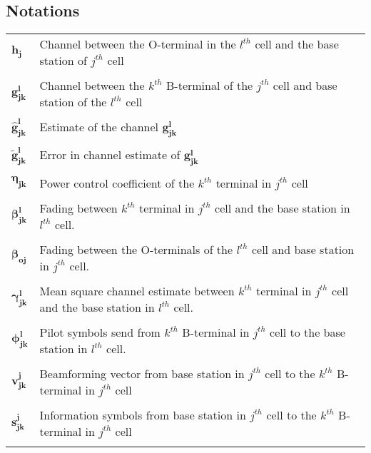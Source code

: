 \documentclass[10pt, a4paper, twoside,fleqn]{article}
\begin{document}
\begin{appendices}
\section{Notations} \label{app:notation}
\begin{flushleft}
\begin{tabular}{ll}
	$\pmb{h_{j}}$                  & Channel between the O-terminal in the $l^{th}$ cell and the base station of $j^{th}$ cell  \\ \\ 
	$\pmb{g_{jk}^{l}}$             & Channel between the $k^{th}$ B-terminal of the $j^{th}$ cell and base station of the $l^{th}$ cell  \\ \\
	$\pmb{\hat g_{jk}^{l}}$        & Estimate of the channel  $\pmb{g_{jk}^{l}}$ \\ \\
 	$\pmb{\widetilde{g}_{jk}^{l}}$ & Error in channel estimate of $\pmb{g_{jk}^{l}}$ \\ \\
	$\pmb{\eta_{jk}}$              & Power control coefficient of the $k^{th}$ terminal in $j^{th}$ cell \\ \\
        $\pmb{\beta_{jk}^{l}}$         & Fading between $k^{th}$ terminal in $j^{th}$ cell and the base station in $l^{th}$ cell. \\ \\
        $\pmb{\beta_{oj}}$             & Fading between the O-terminals of the $l^{th}$ cell and base station in $j^{th}$ cell. \\ \\
        $\pmb{\gamma_{jk}^{l}}$        & Mean square channel estimate between $k^{th}$ terminal in $j^{th}$ cell and the base station in $l^{th}$ cell. \\ \\
        $\pmb{\phi_{jk}^{l}}$          & Pilot symbols send from $k^{th}$ B-terminal in $j^{th}$ cell to the base station in $l^{th}$ cell. \\ \\
        $\pmb{v_{jk}^{j}}$             & Beamforming vector from base station in $j^{th}$ cell to the $k^{th}$ B-terminal in $j^{th}$ cell \\ \\
        $\pmb{s_{jk}^{j}}$             & Information symbols from base station in $j^{th}$ cell to the $k^{th}$ B-terminal in $j^{th}$ cell \\ \\

\end{tabular}
\end{flushleft}
\end{appendices}
\end{document}
